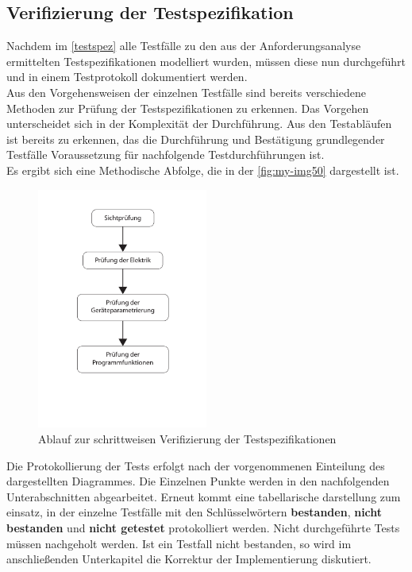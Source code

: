 \documentclass[../../../Bachelorarbeit.tex]{subfiles}
\begin{document}
\subsection{Verifizierung der Testspezifikation} \label{testpruef}
Nachdem im \autoref{testspez} alle Testfälle zu den aus der Anforderungsanalyse ermittelten Testspezifikationen modelliert wurden, müssen diese nun durchgeführt und in einem Testprotokoll dokumentiert werden.\\
Aus den Vorgehensweisen der einzelnen Testfälle sind bereits verschiedene Methoden zur Prüfung der Testspezifikationen zu erkennen. Das Vorgehen unterscheidet sich in der Komplexität der Durchführung. Aus den Testabläufen ist bereits zu erkennen, das die Durchführung und Bestätigung grundlegender Testfälle Voraussetzung für nachfolgende Testdurchführungen ist. \\
Es ergibt sich eine Methodische Abfolge, die in der \autoref{fig:my-img50} dargestellt ist.

\begin{figure}[H]
    \centering
    \includegraphics[width=0.5\textwidth]{Images/pruefablauf.pdf}
    \caption[Prüfablauf]{Ablauf zur schrittweisen Verifizierung der Testspezifikationen}
    \label{fig:my-img50}
\end{figure}

Die Protokollierung der Tests erfolgt nach der vorgenommenen Einteilung des dargestellten Diagrammes. Die Einzelnen Punkte werden in den nachfolgenden Unterabschnitten abgearbeitet. Erneut kommt eine tabellarische darstellung zum einsatz, in der einzelne Testfälle mit den Schlüsselwörtern \textbf{bestanden}, \textbf{nicht bestanden} und \textbf{nicht getestet} protokolliert werden. Nicht durchgeführte Tests müssen nachgeholt werden. Ist ein Testfall nicht bestanden, so wird im anschließenden Unterkapitel die Korrektur der Implementierung diskutiert.
\end{document}
